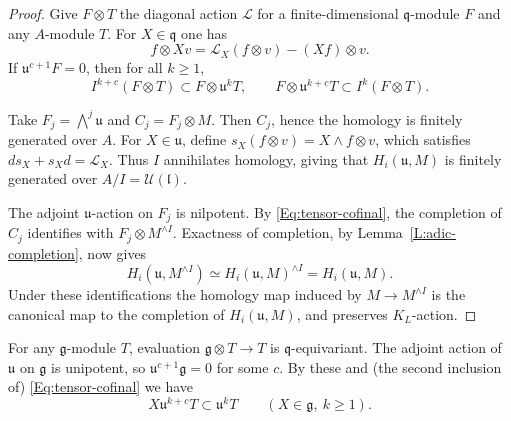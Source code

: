 \documentclass[a4paper,12pt]{amsart}
\numberwithin{equation}{section}
\theoremstyle{plain}
\theoremstyle{definition}
\theoremstyle{remark}
\begin{document}
\begin{proof}
Give $F\otimes T$ the diagonal action $\mathcal L$ for a finite-dimensional $\mathfrak q$-module $F$ and any $A$-module $T$.
For $X\in\mathfrak q$ one has
\[
 f\otimes Xv=\mathcal L_X(f\otimes v)-(Xf)\otimes v .
\]
If $\mathfrak u^{c+1}F=0$, then for all $k\geq1$,
\begin{equation}\label{Eq:tensor-cofinal}
 I^{k+c}(F\otimes T)\subset F\otimes\mathfrak u^kT,
 \qquad F\otimes\mathfrak u^{k+c}T\subset I^k(F\otimes T).
\end{equation}

Take $F_j=\bigwedge^j\mathfrak u$ and $C_j=F_j\otimes M$.
Then $C_j$, hence the homology is finitely generated over $A$.
For $X\in\mathfrak u$, define $s_X(f\otimes v)=X\wedge f\otimes v$, which satisfies $ds_X+s_Xd=\mathcal L_X$.
Thus $I$ annihilates homology, giving that $H_i(\mathfrak u,M)$ is finitely generated over $A/I=\mathcal U(\mathfrak l)$.

The adjoint $\mathfrak u$-action on $F_j$ is nilpotent.
By \eqref{Eq:tensor-cofinal}, the completion of $C_j$ identifies with $F_j\otimes M^{\wedge I}$.
Exactness of completion, by Lemma~\ref{L:adic-completion}, now gives
\begin{equation}\label{Eq:completed-CE-homology}
 H_i(\mathfrak u,M^{\wedge I})\simeq H_i(\mathfrak u,M)^{\wedge I}=H_i(\mathfrak u,M).
\end{equation}
Under these identifications the homology map induced by $M\to M^{\wedge I}$ is the canonical map to the completion of $H_i(\mathfrak u,M)$, and preserves $K_L$-action.
\end{proof}

For any $\mathfrak g$-module $T$, evaluation $\mathfrak g\otimes T\to T$ is $\mathfrak q$-equivariant.
The adjoint action of $\mathfrak u$ on $\mathfrak g$ is unipotent, so $\mathfrak u^{c+1}\mathfrak g=0$ for some $c$. By these and (the second inclusion of) \eqref{Eq:tensor-cofinal} we have
\begin{equation}\label{Eq:cross-level-bound}
 X\mathfrak u^{k+c}T\subset\mathfrak u^kT
 \qquad(X\in\mathfrak g,\ k\geq1).
\end{equation}
\end{document}
